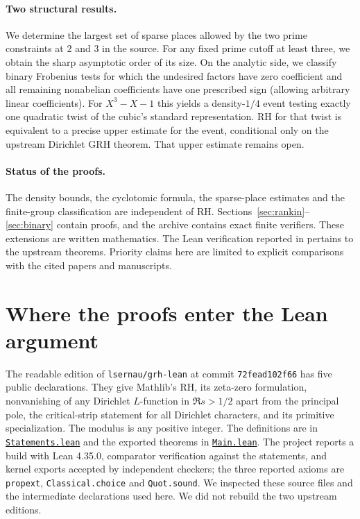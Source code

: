\documentclass[11pt,letterpaper]{article}
\newcommand{\upsrc}[2]{\href{https://github.com/lsernau/grh-lean/blob/72fead102f663d5c7a407964a13dc0cf9d977207/grh/#1}{#2}}
\begin{document}
\paragraph{Two structural results.}
We determine the largest set of sparse places allowed by the two prime constraints at $2$ and $3$ in the source. For any fixed prime cutoff at least three, we obtain the sharp asymptotic order of its size. On the analytic side, we classify binary Frobenius tests for which the undesired factors have zero coefficient and all remaining nonabelian coefficients have one prescribed sign (allowing arbitrary linear coefficients). For $X^3-X-1$ this yields a density-$1/4$ event testing exactly one quadratic twist of the cubic's standard representation. RH for that twist is equivalent to a precise upper estimate for the event, conditional only on the upstream Dirichlet GRH theorem. That upper estimate remains open.

\paragraph{Status of the proofs.} The density bounds, the cyclotomic formula, the sparse-place estimates and the finite-group classification are independent of RH. Sections~\ref{sec:rankin}--\ref{sec:binary} contain proofs, and the archive contains exact finite verifiers. These extensions are written mathematics. The Lean verification reported in \cite{grh} pertains to the upstream theorems. Priority claims here are limited to explicit comparisons with the cited papers and manuscripts.
\clearpage



\clearpage
\section{Where the proofs enter the Lean argument}\label{sec:map}
The readable edition of \texttt{lsernau/grh-lean} at commit \texttt{72fead102f66} has five public declarations. They give Mathlib's RH, its zeta-zero formulation, nonvanishing of any Dirichlet $L$-function in $\Re s>1/2$ apart from the principal pole, the critical-strip statement for all Dirichlet characters, and its primitive specialization. The modulus is any positive integer. The definitions are in \upsrc{src/Statements.lean}{\texttt{Statements.lean}} and the exported theorems in \upsrc{src/Main.lean}{\texttt{Main.lean}}. The project reports a build with Lean 4.35.0, comparator verification against the statements, and kernel exports accepted by independent checkers; the three reported axioms are \texttt{propext}, \texttt{Classical.choice} and \texttt{Quot.sound}. We inspected these source files and the intermediate declarations used here. We did not rebuild the two upstream editions.
\end{document}
